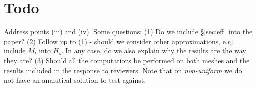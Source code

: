 \documentclass[10pt, a4paper]{article}
\begin{document}





\section*{Todo}
Address points (iii) and (iv). Some questions: (1) Do we include \S\ref{sec:eff}
into the paper? (2) Follow up to (1) - should we consider other approximations,
e.g. include $M_l$ into $H_s$. In any case, do we also explain why the results
are the way they are? (3) Should all the computations be performed on both meshes
and the results included in the response to reviewers. Note that on
\textit{non-uniform} we do not have an analutical solution to test against.



\end{document}
